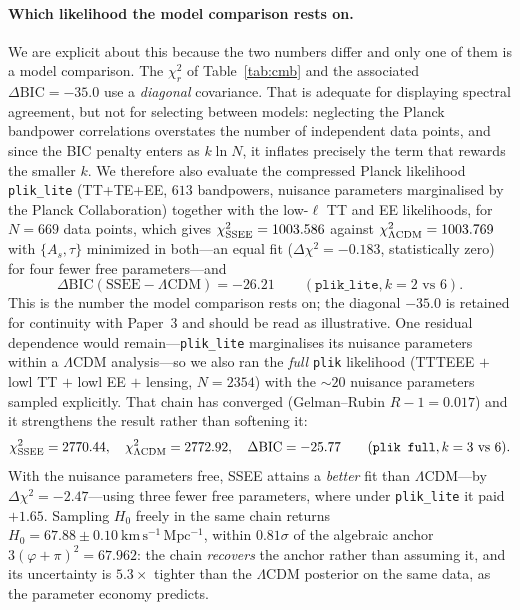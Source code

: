 \documentclass[a4paper,11pt]{article}
\newcommand{\kms}{\mathrm{km\,s^{-1}\,Mpc^{-1}}}
\begin{document}
\paragraph{Which likelihood the model comparison rests on.} We are explicit
about this because the two numbers differ and only one of them is a model
comparison. The $\chi^2_r$ of Table~\ref{tab:cmb} and the associated
$\Delta\mathrm{BIC}=-35.0$ use a \emph{diagonal} covariance. That is adequate
for displaying spectral agreement, but not for selecting between models:
neglecting the Planck bandpower correlations overstates the number of
independent data points, and since the BIC penalty enters as $k\ln N$, it
inflates precisely the term that rewards the smaller $k$. We therefore also
evaluate the compressed Planck likelihood \texttt{plik\_lite}
(TT+TE+EE, $613$ bandpowers, nuisance parameters marginalised by the Planck
Collaboration) together with the low-$\ell$ TT and EE likelihoods, for $N=669$
data points, which gives $\chi^2_{\rm SSEE}=1003.586$ against
$\chi^2_{\Lambda\rm CDM}=1003.769$ with $\{A_s,\tau\}$ minimized in both---an
equal fit ($\Delta\chi^2=-0.183$, statistically zero) for four fewer free
parameters---and
\begin{equation}
  \label{eq:dbic-cmb}
  \Delta\mathrm{BIC}(\text{SSEE}-\Lambda\text{CDM}) = -26.21 \qquad
  (\texttt{plik\_lite}, k=2 \text{ vs } 6) .
\end{equation}
This is the number the model comparison rests on; the diagonal $-35.0$ is
retained for continuity with Paper~3 and should be read as illustrative. One
residual dependence would remain---\texttt{plik\_lite} marginalises its nuisance
parameters within a $\Lambda$CDM analysis---so we also ran the \emph{full}
\texttt{plik} likelihood (TTTEEE $+$ lowl TT $+$ lowl EE $+$ lensing,
$N=2354$) with the ${\sim}20$ nuisance parameters sampled explicitly. That chain
has converged (Gelman--Rubin $R-1=0.017$) and it strengthens the result rather
than softening it:
\begin{equation}
  \label{eq:dbic-full}
  \chi^2_{\rm SSEE}=2770.44 , \quad \chi^2_{\Lambda\rm CDM}=2772.92 , \quad
  \Delta\mathrm{BIC}=-25.77 \qquad (\texttt{plik full}, k=3 \text{ vs } 6) .
\end{equation}
With the nuisance parameters free, SSEE attains a \emph{better} fit than
$\Lambda$CDM---by $\Delta\chi^2=-2.47$---using three fewer free parameters,
where under \texttt{plik\_lite} it paid $+1.65$. Sampling $H_0$ freely in the
same chain returns $H_0=67.88\pm0.10~\kms$, within $0.81\sigma$ of the algebraic
anchor $3(\varphi+\pi)^2=67.962$: the chain \emph{recovers} the anchor rather
than assuming it, and its uncertainty is $5.3\times$ tighter than the
$\Lambda$CDM posterior on the same data, as the parameter economy predicts.
\end{document}
